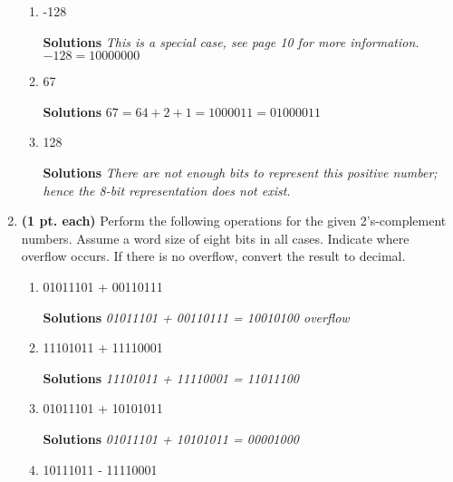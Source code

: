 \begin{enumerate}
\begin{enumerate}
\item  -128 

\begin{onlysolution} \textbf{Solutions} \itshape{
This is a special case, see page 10 for more information.
$-128 = 10000000$
} \end{onlysolution} 

\item  67 

\begin{onlysolution} \textbf{Solutions} \itshape{
$67=64+2+1 = 100 0011 = 0100 0011$
} \end{onlysolution} 

\item  128 

\begin{onlysolution} \textbf{Solutions} \itshape{
There are not enough bits to represent this positive number; hence
the 8-bit representation does not exist.
} \end{onlysolution} 

\end{enumerate}


\item \textbf{ (1 pt. each)} Perform the following operations for the given 
2's-complement numbers. Assume a word size of eight bits
in all cases. Indicate where overflow occurs. If there is no overflow, 
convert the result to decimal. 
\begin{enumerate}

\item 01011101 + 00110111 

\begin{onlysolution} \textbf{Solutions} \itshape{
 01011101 + 00110111 = 10010100  overflow
} \end{onlysolution} 

\item 11101011 + 11110001 

\begin{onlysolution} \textbf{Solutions} \itshape{
 11101011 + 
 11110001 =
 11011100
} \end{onlysolution} 

\item 01011101 + 10101011 

\begin{onlysolution} \textbf{Solutions} \itshape{
 01011101 + 
 10101011 =
 00001000
} \end{onlysolution} 

\item 10111011 - 11110001 


\end{enumerate}
\end{enumerate}
